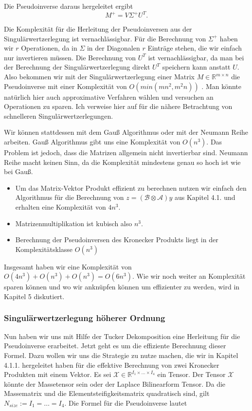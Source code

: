 Die Pseudoinverse daraus hergeleitet ergibt
\begin{equation*}
M^{+}=V\Sigma ^{+}U^{T}.
\end{equation*}

Die Komplexität für die Herleitung der Pseudoinversen aus der Singulärwertzerlegung ist vernachlässigbar. Für die Berechnung von $\Sigma^+$ haben wir $r$ Operationen, da in $\Sigma$ in der Diagonalen $r$ Einträge stehen, die wir einfach nur invertieren müssen. Die Berechnung von $U^{T}$ ist vernachlässigbar, da man bei der Berechnung der Singulärwertzerlegung direkt $U^{T}$ speichern kann anstatt $U$.
Also bekommen wir mit der Singulärwertzerlegung einer Matrix $M \in \mathbb{R}^{m \times n}$ die Pseudoinverse mit einer Komplexität von $O(min(mn^2,m^2 n))$ \cite[2]{SVD}. Man könnte natürlich hier auch approximative Verfahren wählen und versuchen an Operationen zu sparen. Ich verweise hier auf \cite{SVD} für die nähere Betrachtung von schnelleren Singulärwertzerlegungen.


Wir können stattdessen mit dem Gauß Algorithmus oder mit der Neumann Reihe arbeiten. Gauß Algorithmus gibt uns eine Komplexität von $O(n^3)$. Das Problem ist jedoch, dass die Matrizen allgemein nicht invertierbar sind. 
Neumann Reihe macht keinen Sinn, da die Komplexität mindestens genau so hoch ist wie bei Gauß.

\begin{itemize}
\item Um das Matrix-Vektor Produkt effizient zu berechnen nutzen wir einfach den Algorithmus für die Berechnung von $z=(\mathcal{B} \otimes \mathcal{A})y$ aus Kapitel 4.1. und erhalten eine Komplexität von $4n^3$.

\item Matrizenmultiplikation ist kubisch also $n^3$. 

\item Berechnung der Pseudoinversen des Kronecker Produkts liegt in der Komplexitätsklasse $O(n^3)$

\end{itemize}

Insgesamt haben wir eine Komplexität von $O(4n^3)+O(n^3)+O(n^3)=O(6n^3)$.
Wie wir noch weiter an Komplexität sparen können und wo wir anknüpfen können um effizienter zu werden, wird in Kapitel 5 diskutiert.

\subsubsection{Singulärwertzerlegung höherer Ordnung}
Nun haben wir uns mit Hilfe der Tucker Dekomposition eine Herleitung für die Pseudoinverse erarbeitet. Jetzt geht es um die effiziente Berechnung dieser Formel. Dazu wollen wir uns die Strategie zu nutze machen, die wir in Kapitel 4.1.1. hergeleitet haben für die effektive Berechnung von zwei Kronecker Produkten mit einem Vektor.
Es sei $\mathscr{X} \in \mathbb{R}^{I_1 \times \dots \times I_{4}}$ ein Tensor. Der Tensor $\mathscr{X}$ könnte der Massetensor sein oder der Laplace Bilinearform Tensor. Da die Massematrix und die Elementsteifigkeitsmatrix quadratisch sind, gilt $N_{size}:= I_1 = \dots = I_4$.
Die Formel für die Pseudoinverse lautet

